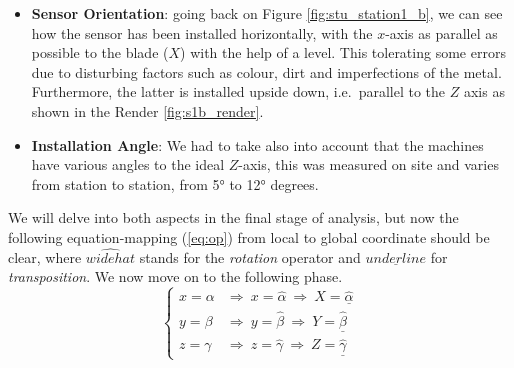\begin{itemize}
    \item \textbf{Sensor Orientation}: 
    going back on Figure \ref{fig:stu_station1_b}, we can see how the sensor has been installed horizontally, with the $x$-axis as parallel as possible to the blade ($X$) with 
    the help of a level. This tolerating some errors due to disturbing factors such as colour, dirt and imperfections of the metal.
    Furthermore, the latter is installed upside down, i.e.\ parallel to the $Z$ axis as shown in the Render \ref{fig:s1b_render}.
    \item \textbf{Installation Angle}:
    We had to take also into account that the machines have various angles to the ideal $Z$-axis, this was measured on site and varies from station to station, from 5° to 12° degrees.
\end{itemize}
We will delve into both aspects in the final stage of analysis, but now the following equation-mapping (\ref{eq:op}) from local to global coordinate should be clear, 
where $\widehat{widehat}$ stands for the \textit{rotation} operator and $\underline{underline}$ for \textit{transposition}. We now move on to the following phase.
\begin{equation}
    \left\{ \begin{array}{cl}
        x = \alpha & \Rightarrow  \ x = \widehat{\alpha} \ \Rightarrow  \ X = \underline{\widehat{\alpha}} \\
        y = \beta & \Rightarrow  \ y = \widehat{\beta} \ \Rightarrow  \ Y = \underline{\widehat{\beta}} \\ 
        z = \gamma & \Rightarrow  \ z = \widehat{\gamma} \ \Rightarrow  \ Z = \underline{\widehat{\gamma}}
        \end{array} \right.
    \label{eq:op}
\end{equation}

